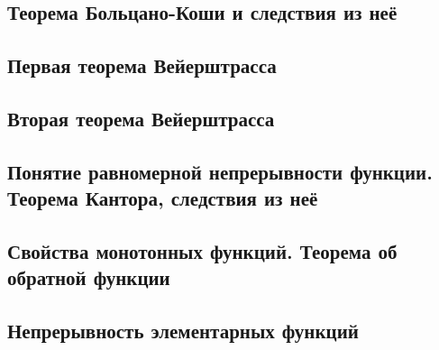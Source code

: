 \subsection{Теорема Больцано-Коши и следствия из неё}
\subsection{Первая теорема Вейерштрасса}
\subsection{Вторая теорема Вейерштрасса}
\subsection{Понятие равномерной непрерывности функции. Теорема Кантора, следствия из неё}
\subsection{Свойства монотонных функций. Теорема об обратной функции}
\subsection{Непрерывность элементарных функций}

